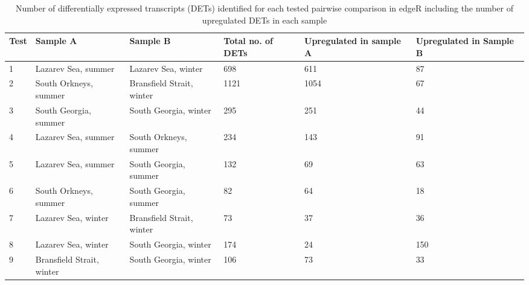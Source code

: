 
\begin{table}[]
{\scriptsize
\caption{Number of differentially expressed transcripts (DETs) identified for each tested pairwise comparison in edgeR including the number of upregulated DETs in each sample}
\label{Tab1_2}
\begin{tabular}{@{}llllL{1.5cm}L{1.5cm}@{}}
\toprule
\textbf{Test} & \textbf{Sample A}         & \textbf{Sample B}         & \textbf{Total no. of DETs} & \textbf{Upregulated in sample A} & \textbf{Upregulated in Sample B} \\              & Lazarev Sea, summer       & Lazarev Sea, winter       & 698                        & 611                              & 87                               \\
2             & South Orkneys, summer     & Bransfield Strait, winter & 1121                       & 1054                             & 67                               \\
3             & South Georgia, summer     & South Georgia, winter     & 295                        & 251                              & 44                               \\
4             & Lazarev Sea, summer       & South Orkneys, summer     & 234                        & 143                              & 91                               \\
5             & Lazarev Sea, summer       & South Georgia, summer     & 132                        & 69                               & 63                               \\
6             & South Orkneys, summer     & South Georgia, summer     & 82                         & 64                               & 18                               \\
7             & Lazarev Sea, winter       & Bransfield Strait, winter & 73                         & 37                               & 36                               \\
8             & Lazarev Sea, winter       & South Georgia, winter     & 174                        & 24                               & 150                              \\
9             & Bransfield Strait, winter & South Georgia, winter     & 106                        & 73                               & 33                               \\ \bottomrule
\end{tabular}
}
\end{table}
